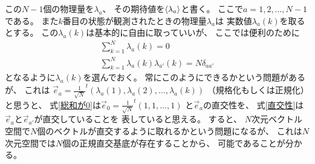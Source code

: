 \documentclass[a4paper, 10pt]{jsarticle}
\begin{document}
この$N-1$個の物理量を$\lambda_a$、
その期待値を$\Braket{\lambda_a}$と書く。
ここで$a = 1, 2, \dots, N-1$である。
また$k$番目の状態が観測されたときの物理量$\lambda_a$は
実数値$\lambda_a(k)$を取るとする。
この$\lambda_a(k)$は基本的に自由に取っていいが、
ここでは便利のために
\begin{align}
	\sum_{k=1}^N \lambda_a(k) = 0
	\label{総和が0} \\
	\sum_{k=1}^N \lambda_a(k) \lambda_{a'}(k) = N \delta_{aa'}
	\label{直交性}
\end{align}
となるように$\lambda_a(k)$を選んでおく。
常にこのようにできるかという問題があるが、
これは
$\vec{e}_a = \frac{1}{\sqrt{N}}
^t\!(\lambda_a(1), \lambda_a(2), \dots, \lambda_a(k))$
（規格化もしくは正規化）と思うと、
式\eqref{総和が0}は$\vec{e}_0 = \frac{1}{\sqrt{N}} ^t\!(1, 1, \dots, 1)$
と$\vec{e}_a$の直交性を、
式\eqref{直交性}は$\vec{e}_a$と$\vec{e}_{a'}$が直交していることを
表していると思える。
すると、
$N$次元ベクトル空間で$N$個のベクトルが直交するように取れるかという問題になるが、
これは$N$次元空間では$N$個の正規直交基底が存在することから、
可能であることが分かる。
\end{document}

